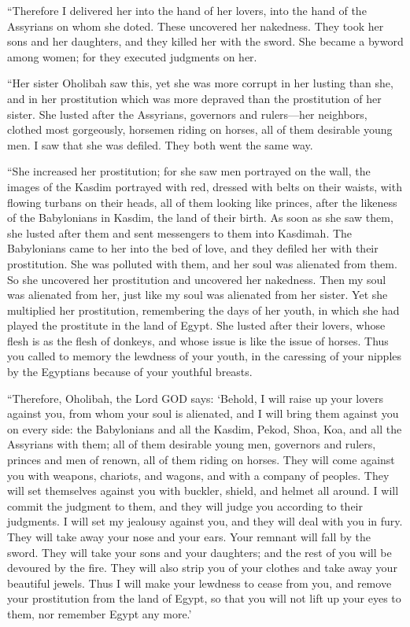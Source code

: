 \myverse{}“Therefore I delivered her into the hand of her lovers, into the
hand of the Assyrians on whom she doted.
\myverse{}These uncovered her nakedness. They took her sons and her daughters, and
they killed her with the sword. She became a byword among women; for they executed judgments on her.

\myverse{}“Her sister Oholibah saw this, yet she was more corrupt in her
lusting than she, and in her prostitution which was more depraved than the prostitution of her sister.
\myverse{}She lusted after the Assyrians, governors and rulers—her neighbors, clothed
most gorgeously, horsemen riding on horses, all of them desirable young men.
\myverse{}I saw that she was defiled. They both went the same way.

\myverse{}“She increased her prostitution; for she saw men portrayed on
the wall, the images of the Kasdim portrayed with red,
\myverse{}dressed with belts on their waists, with flowing turbans on their heads,
all of them looking like princes, after the likeness of the Babylonians in Kasdim, the land of their birth.
\myverse{}As soon as she saw them, she lusted after them and sent messengers to them into Kasdimah.
\myverse{}The Babylonians came to her into the bed of love, and they defiled her with
their prostitution. She was polluted with them, and her soul was alienated from them.
\myverse{}So she uncovered her prostitution and uncovered her nakedness. Then my soul
was alienated from her, just like my soul was alienated from her sister.
\myverse{}Yet she multiplied her prostitution, remembering the days of her youth, in
which she had played the prostitute in the land of Egypt.
\myverse{}She lusted after their lovers, whose flesh is as the flesh of donkeys, and
whose issue is like the issue of horses.
\myverse{}Thus you called to memory the lewdness of your youth, in the caressing of
your nipples by the Egyptians because of your youthful breasts.

\myverse{}“Therefore, Oholibah, the Lord GOD says: ‘Behold, I will raise
up your lovers against you, from whom your soul is alienated, and I will bring them against you on every
side:
\myverse{}the Babylonians and all the Kasdim, Pekod, Shoa, Koa, and all the Assyrians
with them; all of them desirable young men, governors and rulers, princes and men of renown, all of them
riding on horses.
\myverse{}They will come against you with weapons, chariots, and wagons, and with a
company of peoples. They will set themselves against you with buckler, shield, and helmet all around.
I will commit the judgment to them, and they will judge you according to their judgments.
\myverse{}I will set my jealousy against you, and they will deal with you in fury.
They will take away your nose and your ears. Your remnant will fall by the sword. They will take your
sons and your daughters; and the rest of you will be devoured by the fire.
\myverse{}They will also strip you of your clothes and take away your beautiful jewels.
\myverse{}Thus I will make your lewdness to cease from you, and remove your prostitution
from the land of Egypt, so that you will not lift up your eyes to them, nor remember Egypt any more.’

